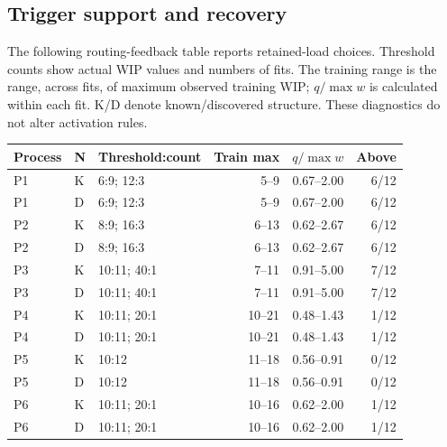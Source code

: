 \clearpage

\subsection{Trigger support and recovery}

The following routing-feedback table reports retained-load choices. Threshold counts show actual WIP values and numbers of fits. The training range is the range, across fits, of maximum observed training WIP; $q/\max w$ is calculated within each fit. K/D denote known/discovered structure. These diagnostics do not alter activation rules.

\begin{center}\small\setlength{\tabcolsep}{3pt}\begin{tabular}{llp{}rrr}\toprule

Process & N & Threshold:count & Train max & $q/\max w$ & Above\\\midrule

P1 & K & 6:9; 12:3 & 5--9 & 0.67--2.00 & 6/12\\

P1 & D & 6:9; 12:3 & 5--9 & 0.67--2.00 & 6/12\\

P2 & K & 8:9; 16:3 & 6--13 & 0.62--2.67 & 6/12\\

P2 & D & 8:9; 16:3 & 6--13 & 0.62--2.67 & 6/12\\

P3 & K & 10:11; 40:1 & 7--11 & 0.91--5.00 & 7/12\\

P3 & D & 10:11; 40:1 & 7--11 & 0.91--5.00 & 7/12\\

P4 & K & 10:11; 20:1 & 10--21 & 0.48--1.43 & 1/12\\

P4 & D & 10:11; 20:1 & 10--21 & 0.48--1.43 & 1/12\\

P5 & K & 10:12 & 11--18 & 0.56--0.91 & 0/12\\

P5 & D & 10:12 & 11--18 & 0.56--0.91 & 0/12\\

P6 & K & 10:11; 20:1 & 10--16 & 0.62--2.00 & 1/12\\

P6 & D & 10:11; 20:1 & 10--16 & 0.62--2.00 & 1/12\\

\bottomrule\end{tabular}\end{center}

